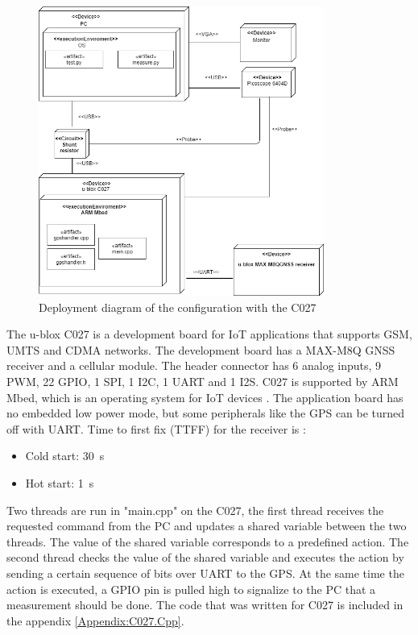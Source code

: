 \begin{figure}[H]
\centering
\includegraphics[height=9.5cm]{Project_Report/Images/C027_deploy.png}
\caption{Deployment diagram of the configuration with the C027}
\label{fig:deploy_C027}
\end{figure}
\vspace{5mm}The u-blox C027 is a development board for IoT applications that supports GSM, UMTS and CDMA networks. The development board has a MAX-M8Q GNSS receiver and a cellular module. The header connector has 6 analog inputs, 9 PWM, 22 GPIO, 1 SPI, 1 I2C, 1 UART and 1 I2S. C027 is supported by ARM Mbed, which is an operating system for IoT devices \cite{C027}. The application board has no embedded low power mode, but some peripherals like the GPS can be turned off with UART. Time to first fix (TTFF) for the receiver is \cite{MAX-M8}:
\begin{itemize}
    \item Cold start: 30 \,s
    \item Hot  start: 1 \,s
\end{itemize}

Two threads are run in "main.cpp" on the C027, the first thread receives the requested command from the PC and updates a shared variable between the two threads. The value of the shared variable corresponds to a predefined action. The second thread checks the value of the shared variable and executes the action by sending a certain sequence of bits over UART to the GPS. At the same time the action is executed, a GPIO pin is pulled high to signalize to the PC that a measurement should be done. The code that was written for C027 is included in the appendix \ref{Appendix:C027.Cpp}. 

